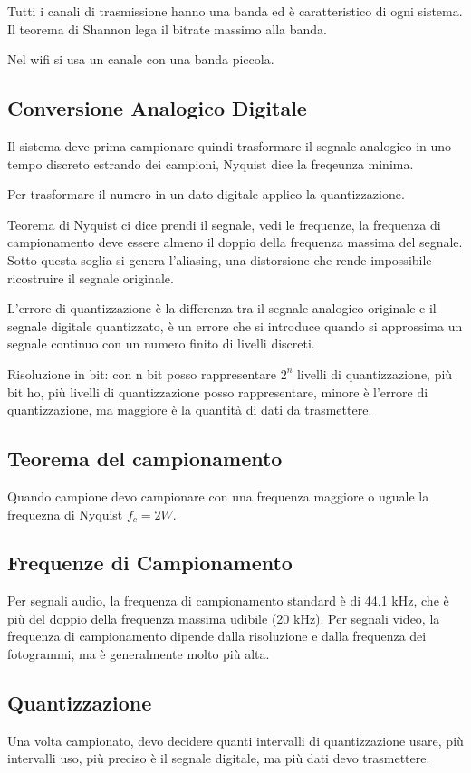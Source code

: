 Tutti i canali di trasmissione hanno una banda ed è caratteristico di ogni sistema.
Il teorema di Shannon lega il bitrate massimo alla banda.

Nel wifi si usa un canale con una banda piccola.

\subsection{Conversione Analogico Digitale}
Il sistema deve prima campionare quindi trasformare il segnale analogico in uno tempo discreto
estrando dei campioni, Nyquist dice la freqeunza minima.

Per trasformare il numero in un dato digitale applico la quantizzazione.

Teorema di Nyquist ci dice prendi il segnale, vedi le frequenze, la frequenza di campionamento
deve essere almeno il doppio della frequenza massima del segnale. Sotto questa soglia si genera
l'aliasing, una distorsione che rende impossibile ricostruire il segnale originale.

L'errore di quantizzazione è la differenza tra il segnale analogico originale e il 
segnale digitale quantizzato, è un errore che si introduce quando si approssima un 
segnale continuo con un numero finito di livelli discreti.

Risoluzione in bit: con n bit posso rappresentare $2^n$ livelli di quantizzazione, 
più bit ho, più livelli di quantizzazione posso rappresentare, minore è l'errore 
di quantizzazione, ma maggiore è la quantità di dati da trasmettere.

\subsection{Teorema del campionamento}
Quando campione devo campionare con una frequenza maggiore o uguale la frequezna di Nyquist
$f_c=2W$.

\subsection{Frequenze di Campionamento}
Per segnali audio, la frequenza di campionamento standard è di 44.1 kHz, 
che è più del doppio della frequenza massima udibile (20 kHz). 
Per segnali video, la frequenza di campionamento dipende dalla risoluzione 
e dalla frequenza dei fotogrammi, ma è generalmente molto più alta.

\subsection{Quantizzazione}
Una volta campionato, devo decidere quanti intervalli di quantizzazione usare, 
più intervalli uso, più preciso è il segnale digitale, ma più dati devo trasmettere.

